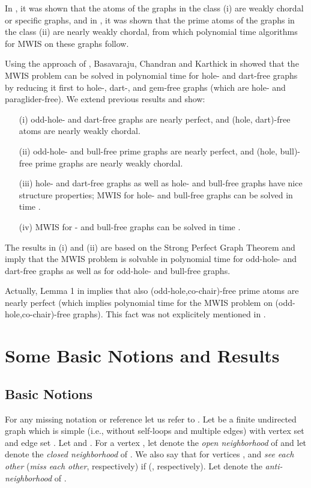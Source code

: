 \documentclass[11pt]{article}
\newcommand{\0}{\text{ has a co-join to }}
\newcommand{\1}{\text{ has a join to }}
\begin{document}
In \cite{BraGiaMaf2012}, it was shown that the atoms of the graphs in the class (i) are weakly chordal or specific graphs, and in \cite{BraGia2012}, 
it was shown that the prime atoms of the graphs in the class (ii) are nearly weakly chordal, from which polynomial time algorithms for MWIS on these graphs follow.  

Using the approach of \cite{BraGia2012,BraGiaMaf2012}, Basavaraju, Chandran and Karthick in \cite{BasChaKar2012} showed that the MWIS problem can be solved in polynomial time for hole- and dart-free graphs by reducing it first to hole-, dart-, and gem-free graphs (which are hole- and paraglider-free). We extend previous results and show:
\begin{itemize}
\item[(i)] odd-hole- and dart-free graphs are nearly perfect, and (hole, dart)-free atoms are nearly weakly chordal. 
\item[(ii)] odd-hole- and bull-free prime graphs are nearly perfect, and (hole, bull)-free prime graphs are nearly weakly chordal. 
\item[(iii)] hole- and dart-free graphs as well as hole- and bull-free graphs have nice structure properties; MWIS for hole- and bull-free graphs can be solved in time . 
\item[(iv)] MWIS for - and bull-free graphs can be solved in time . 
\end{itemize}

The results in (i) and (ii) are based on the Strong Perfect Graph Theorem and imply that the MWIS problem is solvable in polynomial time for odd-hole- and dart-free graphs as well as for odd-hole- and bull-free graphs. 

Actually, Lemma 1 in \cite{BraGia2012} implies that also (odd-hole,co-chair)-free prime atoms are nearly perfect (which implies polynomial time for the MWIS problem on (odd-hole,co-chair)-free graphs). This fact was not explicitely mentioned in \cite{BraGia2012}. 

\section{Some Basic Notions and Results}  

\subsection{Basic Notions}  

For any missing notation or reference let us refer to \cite{BraLeSpi1999}. Let  be a finite undirected graph which is simple (i.e., without self-loops and multiple edges) with vertex set  and edge set . 
Let  and . 
For a vertex , let  denote the {\em open neighborhood} of  and let  denote the {\em closed neighborhood} of . We also say that for vertices ,  and  {\em see each other} ({\em miss each other}, respectively) if  (, respectively). 
Let  denote the {\em anti-neighborhood} of .  
\end{document}
